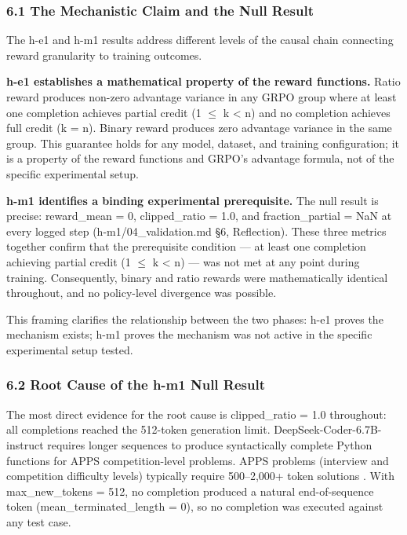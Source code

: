 
\subsubsection{6.1 The Mechanistic Claim and the Null Result}

The h-e1 and h-m1 results address different levels of the causal chain connecting reward granularity to training outcomes.

\textbf{h-e1 establishes a mathematical property of the reward functions.} Ratio reward produces non-zero advantage variance in any GRPO group where at least one completion achieves partial credit (1 $\leq$ k < n) and no completion achieves full credit (k = n). Binary reward produces zero advantage variance in the same group. This guarantee holds for any model, dataset, and training configuration; it is a property of the reward functions and GRPO's advantage formula, not of the specific experimental setup.

\textbf{h-m1 identifies a binding experimental prerequisite.} The null result is precise: reward\_mean = 0, clipped\_ratio = 1.0, and fraction\_partial = NaN at every logged step (h-m1/04\_validation.md §6, Reflection). These three metrics together confirm that the prerequisite condition --- at least one completion achieving partial credit (1 $\leq$ k < n) --- was not met at any point during training. Consequently, binary and ratio rewards were mathematically identical throughout, and no policy-level divergence was possible.

This framing clarifies the relationship between the two phases: h-e1 proves the mechanism exists; h-m1 proves the mechanism was not active in the specific experimental setup tested.

\subsubsection{6.2 Root Cause of the h-m1 Null Result}

The most direct evidence for the root cause is clipped\_ratio = 1.0 throughout: all completions reached the 512-token generation limit. DeepSeek-Coder-6.7B-instruct requires longer sequences to produce syntactically complete Python functions for APPS competition-level problems. APPS problems (interview and competition difficulty levels) typically require 500--2,000+ token solutions \citep{Hendrycks2021APPS}. With max\_new\_tokens = 512, no completion produced a natural end-of-sequence token (mean\_terminated\_length = 0), so no completion was executed against any test case.

